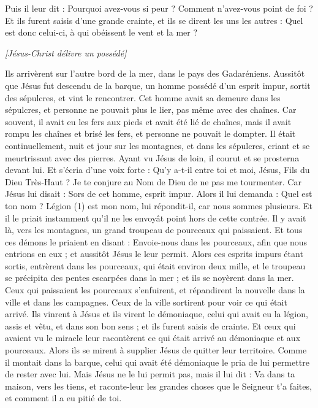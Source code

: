 \begin{multicols}{2}
Puis il leur dit : Pourquoi avez-vous si peur ? Comment n'avez-vous point de foi ?
Et ils furent saisis d'une grande crainte, et ils se dirent les uns les autres : Quel est donc celui-ci, à qui obéissent le vent et la mer ?
\begin{center}
\textit{[Jésus-Christ délivre un possédé]}
\end{center}
\VerseOne{}Ils arrivèrent sur l’autre bord de la mer, dans le pays des Gadaréniens.
Aussitôt que Jésus fut descendu de la barque, un homme possédé d’un esprit impur, sortit des sépulcres, et vint le rencontrer.
Cet homme avait sa demeure dans les sépulcres, et personne ne pouvait plus le lier, pas même avec des chaînes.
Car souvent, il avait eu les fers aux pieds et avait été lié de chaînes, mais il avait rompu les chaînes et brisé les fers, et personne ne pouvait le dompter.
Il était continuellement, nuit et jour sur les montagnes, et dans les sépulcres, criant et se meurtrissant avec des pierres.
Ayant vu Jésus de loin, il courut et se prosterna devant lui.
Et s’écria d’une voix forte : Qu'y a-t-il entre toi et moi, Jésus, Fils du Dieu Très-Haut ? Je te conjure au Nom de Dieu de ne pas me tourmenter.
Car Jésus lui disait : Sors de cet homme, esprit impur.
Alors il lui demanda : Quel est ton nom ? Légion (1) est mon nom, lui répondit-il, car nous sommes plusieurs.
Et il le priait instamment qu'il ne les envoyât point hors de cette contrée.
Il y avait là, vers les montagnes, un grand troupeau de pourceaux qui paissaient.
Et tous ces démons le priaient en disant : Envoie-nous dans les pourceaux, afin que nous entrions en eux ; et aussitôt Jésus le leur permit.
Alors ces esprits impurs étant sortis, entrèrent dans les pourceaux, qui était environ deux mille, et le troupeau se précipita des pentes escarpées dans la mer ; et ils se noyèrent dans la mer.
Ceux qui paissaient les pourceaux s'enfuirent, et répandirent la nouvelle dans la ville et dans les campagnes.
Ceux de la ville sortirent pour voir ce qui était arrivé. Ils vinrent à Jésus et ils virent le démoniaque, celui qui avait eu la légion, assis et vêtu, et dans son bon sens ; et ils furent saisis de crainte.
Et ceux qui avaient vu le miracle leur racontèrent ce qui était arrivé au démoniaque et aux pourceaux.
Alors ils se mirent à supplier Jésus de quitter leur territoire.
Comme il montait dans la barque, celui qui avait été démoniaque le pria de lui permettre de rester avec lui.
Mais Jésus ne le lui permit pas, mais il lui dit : Va dans ta maison, vers les tiens, et raconte-leur les grandes choses que le Seigneur t'a faites, et comment il a eu pitié de toi.

\end{multicols}
